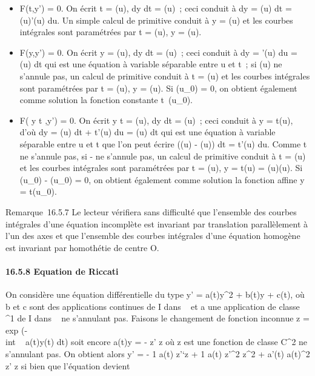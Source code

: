 \begin{itemize}
\itemsep1pt\parskip0pt
\item
  F(t,y') = 0. On écrit t = \phi(u),  dy \over dt =
  \psi(u)~; ceci conduit à dy = \psi(u) dt = \psi(u)\phi'(u) du. Un simple calcul de
  primitive conduit à y = \Psi(u) et les courbes intégrales sont
  paramétrées par t = \phi(u), y = \Psi(u).
\item
  F(y,y') = 0. On écrit y = \phi(u),  dy \over dt =
  \psi(u)~; ceci conduit à dy = \phi'(u) du = \psi(u) dt qui est une équation à
  variable séparable entre u et t~; si \psi(u) ne s'annule pas, un calcul
  de primitive conduit à t = \Phi(u) et les courbes intégrales sont
  paramétrées par t = \Phi(u), y = \psi(u). Si \phi(u_0) = 0, on obtient
  également comme solution la fonction constante
  t\mapsto~\phi(u_0).
\item
  F( y \over t ,y') = 0. On écrit  y
  \over t = \phi(u),  dy \over dt =
  \psi(u)~; ceci conduit à y = t\phi(u), d'où dy = \phi(u) dt + t\phi'(u) du = \psi(u)
  dt qui est une équation à variable séparable entre u et t que l'on
  peut écrire (\psi(u) - \phi(u)) dt = t\phi'(u) du. Comme t ne s'annule pas, si
  \psi - \phi ne s'annule pas, un calcul de primitive conduit à t = \Phi(u) et
  les courbes intégrales sont paramétrées par t = \Phi(u), y = t\psi(u) =
  \Phi(u)\psi(u). Si \psi(u_0) - \phi(u_0) = 0, on obtient
  également comme solution la fonction affine y = t\phi(u_0).
\end{itemize}

Remarque~16.5.7 Le lecteur vérifiera sans difficulté que l'ensemble des
courbes intégrales d'une équation incomplète est invariant par
translation parallèlement à l'un des axes et que l'ensemble des courbes
intégrales d'une équation homogène est invariant par homothétie de
centre O.

\paragraph{16.5.8 Equation de Riccati}

On considère une équation différentielle du type y' = a(t)y^2
+ b(t)y + c(t), où b et c sont des applications continues de I dans ~ et
a une application de classe ^1 de I dans ~ ne s'annulant
pas. Faisons le changement de fonction inconnue z
= exp (-\\int ~ a(t)y(t)
dt) soit encore a(t)y = - z' \over z où z est une
fonction de classe C^2 ne s'annulant pas. On obtient alors y'
= - 1 \over a(t)  z'`\over z + 1
\over a(t)  z'^2 \over
z^2 + a'(t) \over a(t)^2 
z' \over z si bien que l'équation devient

